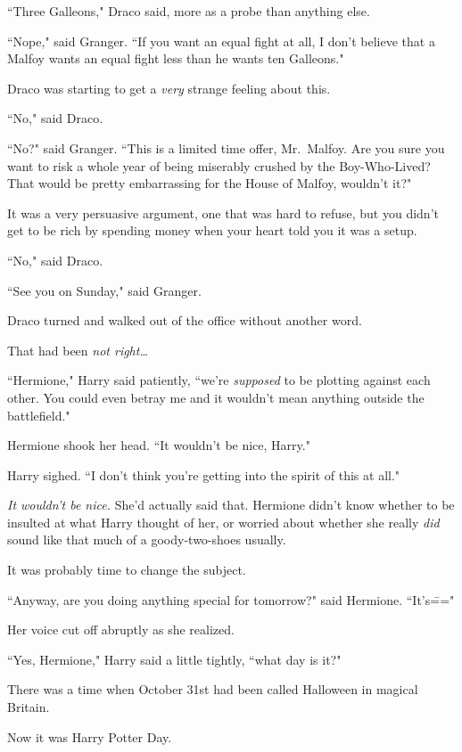 ``Three Galleons," Draco said, more as a probe than anything else.

``Nope," said Granger. ``If you want an equal fight at all, I don't believe that a Malfoy wants an equal fight less than he wants ten Galleons."

Draco was starting to get a \emph{very} strange feeling about this.

``No," said Draco.

``No?" said Granger. ``This is a limited time offer, Mr.~Malfoy. Are you sure you want to risk a whole year of being miserably crushed by the Boy-Who-Lived? That would be pretty embarrassing for the House of Malfoy, wouldn't it?"

It was a very persuasive argument, one that was hard to refuse, but you didn't get to be rich by spending money when your heart told you it was a setup.

``No," said Draco.

``See you on Sunday," said Granger.

Draco turned and walked out of the office without another word.

That had been \emph{not right{\ldots}}

\later

``Hermione," Harry said patiently, ``we're \emph{supposed} to be plotting against each other. You could even betray me and it wouldn't mean anything outside the battlefield."

Hermione shook her head. ``It wouldn't be nice, Harry."

Harry sighed. ``I don't think you're getting into the spirit of this at all."

\emph{It wouldn't be nice.} She'd actually said that. Hermione didn't know whether to be insulted at what Harry thought of her, or worried about whether she really \emph{did} sound like that much of a goody-two-shoes usually.

It was probably time to change the subject.

``Anyway, are you doing anything special for tomorrow?" said Hermione. ``It's\==="

Her voice cut off abruptly as she realized.

``Yes, Hermione," Harry said a little tightly, ``what day is it?"


There was a time when October 31st had been called Halloween in magical Britain.

Now it was Harry Potter Day.

